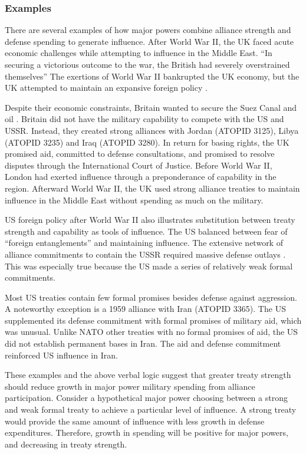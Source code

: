 \documentclass[12pt]{article}
\begin{document}
\subsubsection{Examples} 

There are several examples of how major powers combine alliance strength and defense spending to generate influence.
After World War II, the UK faced acute economic challenges while attempting to influence in the Middle East. 
``In securing a victorious outcome to the war, the British had severely overstrained themselves'' \citep[pg. 367]{Kennedy1987}
The exertions of World War II bankrupted the UK economy, but the UK attempted to maintain an expansive foreign policy \citep{Mayhew1950}. 
  

Despite their economic constraints, Britain wanted to secure the Suez Canal and oil \citep{Rahman1982}. 
Britain did not have the military capability to compete with the US and USSR. 
Instead, they created strong alliances with Jordan (ATOPID 3125), Libya (ATOPID 3235) and Iraq (ATOPID 3280). 
In return for basing rights, the UK promised aid, committed to defense consultations, and promised to resolve disputes through the International Court of Justice. 
Before World War II, London had exerted influence through a preponderance of capability in the region.
Afterward World War II, the UK used strong alliance treaties to maintain influence in the Middle East without spending as much on the military. 


US foreign policy after World War II also illustrates substitution between treaty strength and capability as tools of influence. 
The US balanced between fear of ``foreign entanglements'' and maintaining influence. 
The extensive network of alliance commitments to contain the USSR required massive defense outlays \citep{Fordham1998}. 
This was especially true because the US made a series of relatively weak formal commitments. 


Most US treaties contain few formal promises besides defense against aggression. 
A noteworthy exception is a 1959 alliance with Iran (ATOPID 3365). 
The US supplemented its defense commitment with formal promises of military aid, which was unusual. 
Unlike NATO other treaties with no formal promises of aid, the US did not establish permanent bases in Iran. 
The aid and defense commitment reinforced US influence in Iran. 


These examples and the above verbal logic suggest that greater treaty strength should reduce growth in major power military spending from alliance participation.
Consider a hypothetical major power choosing between a strong and weak formal treaty to achieve a particular level of influence.  
A strong treaty would provide the same amount of influence with less growth in defense expenditures. 
Therefore, growth in spending will be positive for major powers, and decreasing in treaty strength. 
\end{document}
